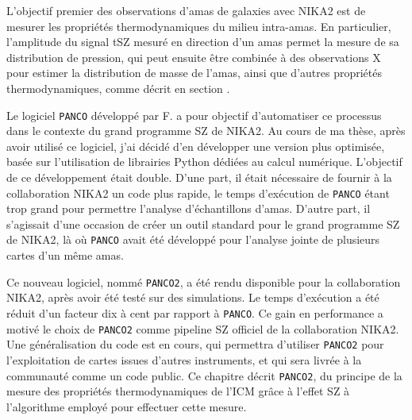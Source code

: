 L'objectif premier des observations d'amas de galaxies avec NIKA2 est de mesurer les propriétés thermodynamiques du milieu intra-amas.
En particulier, l'amplitude du signal tSZ mesuré en direction d'un amas permet la mesure de sa distribution de pression, qui peut ensuite être combinée à des observations X pour estimer la distribution de masse de l'amas, ainsi que d'autres propriétés thermodynamiques, comme décrit en section .

Le logiciel \texttt{PANCO} développé par F.  a pour objectif d'automatiser ce processus dans le contexte du grand programme SZ de NIKA2.
Au cours de ma thèse, après avoir utilisé ce logiciel, j'ai décidé d'en développer une version plus optimisée, basée sur l'utilisation de librairies Python dédiées au calcul numérique.
L'objectif de ce développement était double.
D'une part, il était nécessaire de fournir à la collaboration NIKA2 un code plus rapide, le temps d'exécution de \texttt{PANCO} étant trop grand pour permettre l'analyse d'échantillons d'amas.
D'autre part, il s'agissait d'une occasion de créer un outil standard pour le grand programme SZ de NIKA2, là où \texttt{PANCO} avait été développé pour l'analyse jointe de plusieurs cartes d'un même amas.

Ce nouveau logiciel, nommé \texttt{PANCO2}, a été rendu disponible pour la collaboration NIKA2, après avoir été testé sur des simulations.
Le temps d'exécution a été réduit d'un facteur dix à cent par rapport à \texttt{PANCO}.
Ce gain en performance a motivé le choix de \texttt{PANCO2} comme pipeline SZ officiel de la collaboration NIKA2.
Une généralisation du code est en cours, qui permettra d'utiliser \texttt{PANCO2} pour l'exploitation de cartes issues d'autres instruments, et qui sera livrée à la communauté comme un code public.
Ce chapitre décrit \texttt{PANCO2}, du principe de la mesure des propriétés thermodynamiques de l'ICM grâce à l'effet SZ à l'algorithme employé pour effectuer cette mesure.

